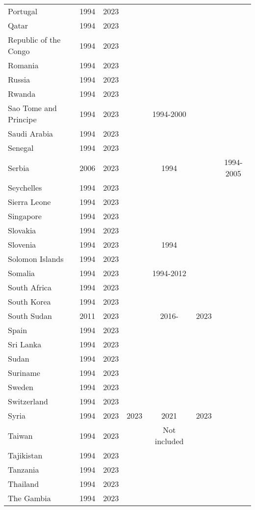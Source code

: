 {\begin{longtable}{lcccccc}
Portugal & 1994 & 2023 &  &  &  & \\
Qatar & 1994 & 2023 &  &  &  & \\
\addlinespace
Republic of the Congo & 1994 & 2023 &  &  &  & \\
Romania & 1994 & 2023 &  &  &  & \\
Russia & 1994 & 2023 &  &  &  & \\
Rwanda & 1994 & 2023 &  &  &  & \\
Sao Tome and Principe & 1994 & 2023 &  & 1994-2000 &  & \\
\addlinespace
Saudi Arabia & 1994 & 2023 &  &  &  & \\
Senegal & 1994 & 2023 &  &  &  & \\
Serbia & 2006 & 2023 &  & 1994 &  & 1994-2005\\
Seychelles & 1994 & 2023 &  &  &  & \\
Sierra Leone & 1994 & 2023 &  &  &  & \\
\addlinespace
Singapore & 1994 & 2023 &  &  &  & \\
Slovakia & 1994 & 2023 &  &  &  & \\
Slovenia & 1994 & 2023 &  & 1994 &  & \\
Solomon Islands & 1994 & 2023 &  &  &  & \\
Somalia & 1994 & 2023 &  & 1994-2012 &  & \\
\addlinespace
South Africa & 1994 & 2023 &  &  &  & \\
South Korea & 1994 & 2023 &  &  &  & \\
South Sudan & 2011 & 2023 &  & 2016- & 2023 & \\
Spain & 1994 & 2023 &  &  &  & \\
Sri Lanka & 1994 & 2023 &  &  &  & \\
\addlinespace
Sudan & 1994 & 2023 &  &  &  & \\
Suriname & 1994 & 2023 &  &  &  & \\
Sweden & 1994 & 2023 &  &  &  & \\
Switzerland & 1994 & 2023 &  &  &  & \\
Syria & 1994 & 2023 & 2023 & 2021 & 2023 & \\
\addlinespace
Taiwan & 1994 & 2023 &  & Not included &  & \\
Tajikistan & 1994 & 2023 &  &  &  & \\
Tanzania & 1994 & 2023 &  &  &  & \\
Thailand & 1994 & 2023 &  &  &  & \\
The Gambia & 1994 & 2023 &  &  &  & \\

\end{longtable}}
